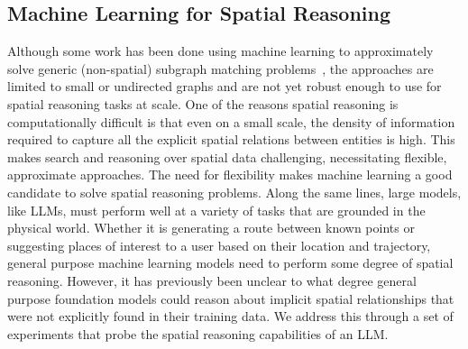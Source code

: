 \subsection{Machine Learning for Spatial Reasoning}
Although some work has been done using machine learning to approximately solve generic (non-spatial) subgraph matching problems~\cite{Krlevza2016, Liu2020Neural,Lan2021,Roy2022}, the approaches are limited to small or undirected graphs and are not yet robust enough to use for spatial reasoning tasks at scale.
One of the reasons spatial reasoning is computationally difficult is that even on a small scale, the density of information required to capture all the explicit spatial relations between entities is high.
This makes search and reasoning over spatial data challenging, necessitating flexible, approximate approaches.
The need for flexibility makes machine learning a good candidate to solve spatial reasoning problems.
Along the same lines, large models, like LLMs, must perform well at a variety of tasks that are grounded in the physical world.
Whether it is generating a route between known points or suggesting places of interest to a user based on their location and trajectory, general purpose machine learning models need to perform some degree of spatial reasoning.
However, it has previously been unclear to what degree general purpose foundation models could reason about implicit spatial relationships that were not explicitly found in their training data.
We address this through a set of experiments that probe the spatial reasoning capabilities of an LLM.





